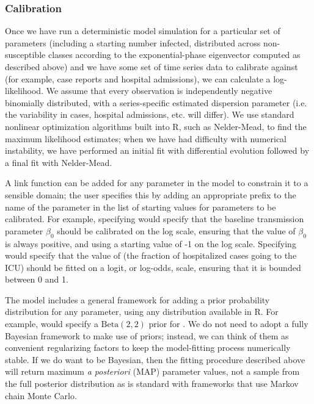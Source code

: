 \documentclass[12pt]{article}\usepackage[]{graphicx}\usepackage[]{color}
\begin{document}
\subsubsection*{Calibration}

Once we have run a deterministic model simulation for a particular set of parameters (including a starting number infected, distributed across non-susceptible classes according to the exponential-phase eigenvector computed as described above) and we have some set of time series data to calibrate against (for example, case reports and hospital admissions), we can calculate a log-likelihood. 
We assume that every observation is independently negative binomially distributed, with a series-specific estimated dispersion parameter (i.e. the variability in cases, hospital admissions, etc. will differ). 
We use standard nonlinear optimization algorithms built into R, such as Nelder-Mead, to find the maximum likelihood estimates; when we have had difficulty with numerical instability, we have performed an initial fit with differential evolution \cite{Mull+11} followed by a final fit with Nelder-Mead.

A link function can be added for any parameter in the model to constrain it to a sensible domain; the user specifies this by adding an appropriate prefix to the name of the parameter in the list of starting values for parameters to be calibrated. 
For example, specifying  would specify that the baseline transmission parameter $\beta_0$ should be calibrated on the log scale, ensuring that the value of $\beta_0$ is always positive, and using a starting value of -1 on the log scale. 
Specifying  would specify that the value of  (the fraction of hospitalized cases going to the ICU) should be fitted on a logit, or log-odds, scale, ensuring that it is bounded between 0 and 1.

The model includes a general framework for adding a prior probability distribution for any parameter, using any distribution available in R. 
For example,  would specify a $\textrm{Beta}(2,2)$ prior for .
We do not need to adopt a fully Bayesian framework to make use of priors; instead, we can think of them as convenient regularizing factors to keep the model-fitting process numerically stable. If we do want to be Bayesian, then the fitting procedure described above will return maximum \emph{a posteriori} (MAP) parameter values, not a sample from the full posterior distribution as is standard with frameworks that use Markov chain Monte Carlo.
\end{document}
